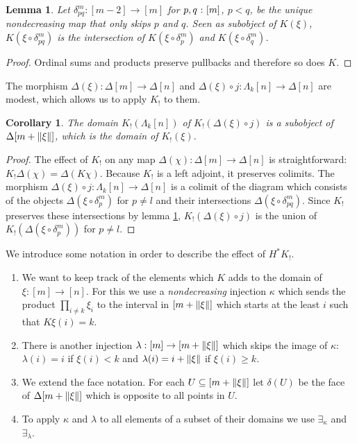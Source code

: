 \documentclass{amsart}
\theoremstyle{plain}
\newtheorem{lemma}[theorem]{Lemma}
\newtheorem{corol}[theorem]{Corollary}
\theoremstyle{definition}
\begin{document}
\begin{lemma} Let $\delta^m_{pq}:[m-2]\to[m]$ for $p,q\mathord{\ :\ }[m]$, $p<q$, be the unique nondecreasing map that only skips $p$ and $q$. Seen as subobject of $K(\xi)$, $K(\xi\circ\delta^m_{pq})$ is the intersection of $K(\xi\circ\delta^m_{p})$ and $K(\xi\circ\delta^m_{q})$. \label{intersection}\end{lemma}%

\begin{proof} Ordinal sums and products preserve pullbacks and therefore so does $K$. \end{proof} %

The morphism $\Delta(\xi):\Delta[m] \to \Delta[n]$ and $\Delta(\xi)\circ j:\Lambda_k[n]\to \Delta[n]$ are modest, which allows us to apply $K_!$ to them.

\begin{corol} The domain $K_!(\Lambda_k[n])$ of $K_!(\Delta(\xi)\circ j)$ is a subobject of $\Delta[m+\left\Vert\xi\right\Vert]$, which is the domain of $K_!(\xi)$. \end{corol}

\begin{proof} The effect of $K_!$ on any map $\Delta(\chi):\Delta[m]\to\Delta[n]$ is straightforward: $K_!\Delta(\chi)=\Delta(K\chi)$. Because $K_!$ is a left adjoint, it preserves colimits. The morphism $\Delta(\xi)\circ j:\Lambda_k[n]\to\Delta[n]$ is a colimit of the diagram which consists of the objects $\Delta(\xi\circ\delta^m_{p})$ for $p\neq l$ and their intersections $\Delta(\xi\circ\delta^m_{pq})$. Since $K_!$ preserves these intersections by lemma \ref{intersection}, $K_!(\Delta(\xi)\circ j)$ is the union of $K_!(\Delta(\xi\circ\delta^m_p))$ for $p\neq l$. \end{proof}

We introduce some notation in order to describe the effect of $H^*K_!$.

\newcommand\face\delta %
\newcommand\ka\kappa
\newcommand\la\lambda
\newcommand\im{\exists_}
\begin{enumerate}
\item We want to keep track of the elements which $K$ adds to the domain of $\xi:[m]\to[n]$. For this we use a \emph{nondecreasing} injection $\ka$ which sends the product $\prod_{i\neq k}\xi_i$ to the interval in $[m+\left\Vert\xi\right\Vert]$ which starts at the least $i$ such that $K\xi(i)=k$.
\item There is another injection $\la:[m]\to[m+\norm\xi]$ which skips the image of $\ka$: $\la(i)=i$ if $\xi(i)<k$ and $\la(i)=i+\norm\xi$ if $\xi(i)\geq k$.
\item We extend the face notation. For each $U\subseteq [m+\left\Vert\xi\right\Vert]$ let $\face(U)$ be the face of $\Delta[m+\left\Vert\xi\right\Vert]$ which is opposite to all points in $U$.
\item To apply $\ka$ and $\la$ to all elements of a subset of their domains we use $\im \ka$ and $\im\la$.
\end{enumerate}
\end{document}

